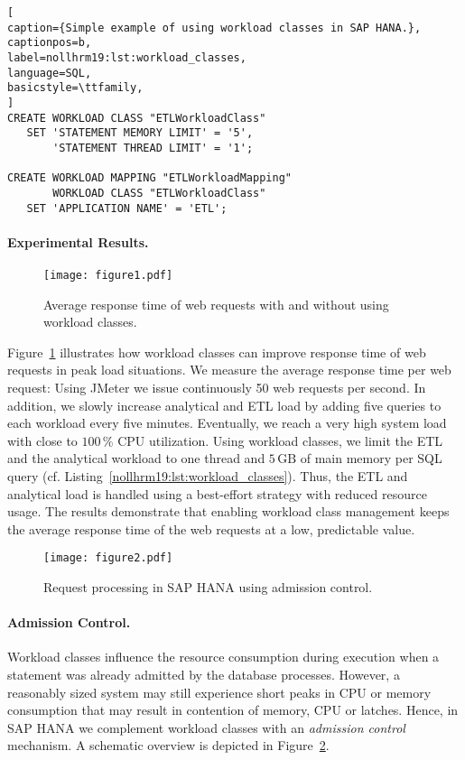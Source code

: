 \documentclass[11pt]{article}
\begin{document}
\begin{lstlisting}[
caption={Simple example of using workload classes in SAP HANA.},
captionpos=b,
label=nollhrm19:lst:workload_classes,
language=SQL,
basicstyle=\ttfamily,
]
CREATE WORKLOAD CLASS "ETLWorkloadClass"
   SET 'STATEMENT MEMORY LIMIT' = '5',
       'STATEMENT THREAD LIMIT' = '1';

CREATE WORKLOAD MAPPING "ETLWorkloadMapping"
       WORKLOAD CLASS "ETLWorkloadClass"
   SET 'APPLICATION NAME' = 'ETL'; 
\end{lstlisting}

\paragraph*{Experimental Results.}
\begin{figure}
\centering
\texttt{[image: figure1.pdf]}
\caption{Average response time of web requests with and without using workload classes.}
\label{nollhrm19:plt:wlm_jmeter}
\end{figure}
Figure~\ref{nollhrm19:plt:wlm_jmeter} illustrates how workload classes can improve response time of web requests in peak load situations.
We measure the average response time per web request: 
Using JMeter we issue continuously 50 web requests per second.
In addition, we slowly increase analytical and ETL load by adding five queries to each workload every five minutes.
Eventually, we reach a very high system load with close to $100\,\mathrm{\%}$ CPU utilization.
Using workload classes, we limit the ETL and the analytical workload to one thread and $5\,\mathrm{GB}$ of main memory per SQL query (cf. Listing~\ref{nollhrm19:lst:workload_classes}).
Thus, the ETL and analytical load is handled using a best-effort strategy with reduced resource usage.
The results demonstrate that enabling workload class management keeps the average response time of the web requests at a low, predictable value.

\begin{figure}
\centering
\texttt{[image: figure2.pdf]}
\caption{Request processing in SAP HANA using admission control.}
\label{nollhrm19:fig:hana_admission_control}
\end{figure}

\paragraph{Admission Control.}
Workload classes influence the resource consumption during execution when a statement was already admitted by the database processes.
However, a reasonably sized system may still experience short peaks in CPU or memory consumption that may result in contention of memory, CPU or latches.
Hence, in SAP HANA we complement workload classes with an \emph{admission control} mechanism.
A schematic overview is depicted in Figure~\ref{nollhrm19:fig:hana_admission_control}.
\end{document}
